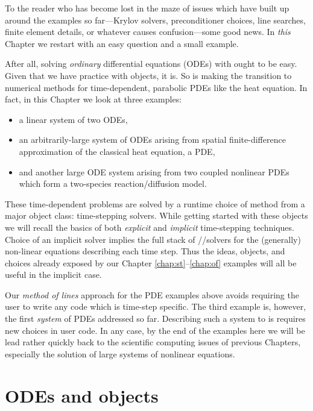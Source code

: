 
To the reader who has become lost in the maze of issues which have built up around the examples so far---Krylov solvers, preconditioner choices, line searches, finite element details, or whatever causes confusion---some good news.  In \emph{this} Chapter we restart with an easy question and a small example.

After all, solving \emph{ordinary} differential equations (ODEs) with \PETSc ought to be easy.  Given that we have practice with \PETSc objects, it is.  So is making the transition to numerical methods for time-dependent, parabolic PDEs like the heat equation.  In fact, in this Chapter we look at three examples:
\begin{itemize}
\item a linear system of two ODEs,
\item an arbitrarily-large system of ODEs arising from spatial finite-difference approximation of the classical heat equation, a PDE,
\item and another large ODE system arising from two coupled nonlinear PDEs which form a two-species reaction/diffusion model.
\end{itemize}

These time-dependent problems are solved by a runtime choice of method from a major \PETSc object class: \pTS time-stepping solvers.  While getting started with these objects we will recall the basics of both \emph{explicit} and \emph{implicit} time-stepping techniques.  Choice of an implicit solver implies the full stack of \PETSc \pSNES/\pKSP/\pPC solvers for the (generally) non-linear equations describing each time step.  Thus the ideas, objects, and choices already exposed by our Chapter \ref{chap:st}--\ref{chap:of} examples will all be useful in the implicit case.

Our \emph{method of lines} approach for the PDE examples above avoids requiring the user to write any code which is time-step specific.  The third example is, however, the first \emph{system} of PDEs addressed so far.  Describing such a system to \PETSc is requires new choices in user code.  In any case, by the end of the examples here we will be lead rather quickly back to the scientific computing issues of previous Chapters, especially the solution of large systems of nonlinear equations.


\section{ODEs and \PETSc \pTS objects}

